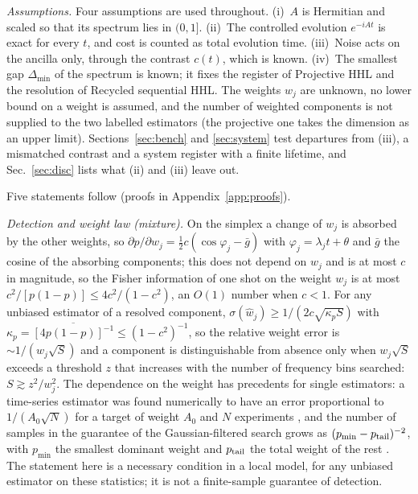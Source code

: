 \documentclass[journal]{IEEEtran}
\begin{document}
\emph{Assumptions.} Four assumptions are used throughout. (i)~$A$ is Hermitian and scaled so that its spectrum lies in $(0,1]$. (ii)~The controlled evolution $e^{-iAt}$ is exact for every $t$, and cost is counted as total evolution time. (iii)~Noise acts on the ancilla only, through the contrast $c(t)$, which is known. (iv)~The smallest gap $\Delta_{\min}$ of the spectrum is known; it fixes the register of Projective HHL and the resolution of Recycled sequential HHL. The weights $w_j$ are unknown, no lower bound on a weight is assumed, and the number of weighted components is not supplied to the two labelled estimators (the projective one takes the dimension as an upper limit). Sections~\ref{sec:bench} and \ref{sec:system} test departures from (iii), a mismatched contrast and a system register with a finite lifetime, and Sec.~\ref{sec:disc} lists what (ii) and (iii) leave out.

Five statements follow (proofs in Appendix~\ref{app:proofs}).

\emph{Detection and weight law (mixture).} On the simplex a change of $w_j$ is absorbed by the other weights, so $\partial p/\partial w_j=\tfrac12c(\cos\varphi_j-\bar g)$ with $\varphi_j=\lambda_jt+\theta$ and $\bar g$ the cosine of the absorbing components; this does not depend on $w_j$ and is at most $c$ in magnitude, so the Fisher information of one shot on the weight $w_j$ is at most $c^2/[p(1-p)]\le4c^2/(1-c^2)$, an $O(1)$ number when $c<1$. For any unbiased estimator of a resolved component, $\sigma(\hat w_j)\ge1/(2c\sqrt{\kappa_pS})$ with $\kappa_p=\overline{[4p(1-p)]^{-1}}\le(1-c^2)^{-1}$, so the relative weight error is $\sim1/(w_j\sqrt S)$ and a component is distinguishable from absence only when $w_j\sqrt S$ exceeds a threshold $z$ that increases with the number of frequency bins searched: $S\gtrsim z^2/w_j^2$. The dependence on the weight has precedents for single estimators: a time-series estimator was found numerically to have an error proportional to $1/(A_0\sqrt N)$ for a target of weight $A_0$ and $N$ experiments \cite{OBrien2019}, and the number of samples in the guarantee of the Gaussian-filtered search grows as $(p_{\min}-p_{\rm tail})^{-2}$, with $p_{\min}$ the smallest dominant weight and $p_{\rm tail}$ the total weight of the rest \cite{QMEGS2024}. The statement here is a necessary condition in a local model, for any unbiased estimator on these statistics; it is not a finite-sample guarantee of detection.
\end{document}
